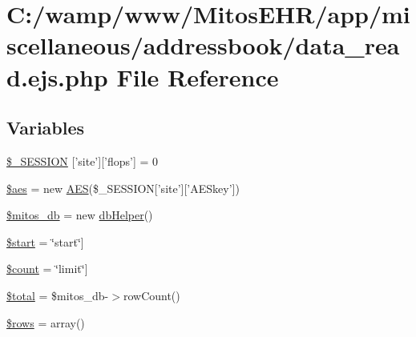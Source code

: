 \hypertarget{miscellaneous_2addressbook_2data__read_8ejs_8php}{\section{\-C\-:/wamp/www/\-Mitos\-E\-H\-R/app/miscellaneous/addressbook/data\-\_\-read.ejs.\-php \-File \-Reference}
\label{miscellaneous_2addressbook_2data__read_8ejs_8php}
}
\subsection*{\-Variables}
\begin{DoxyCompactItemize}
\item 
\hyperlink{miscellaneous_2addressbook_2data__read_8ejs_8php_a99fda8552a3e58235643b79f5af3ded8}{\$\-\_\-\-S\-E\-S\-S\-I\-O\-N} \mbox{[}'site'\mbox{]}\mbox{[}'flops'\mbox{]} = 0
\item 
\hyperlink{miscellaneous_2addressbook_2data__read_8ejs_8php_ab30046a94291cd07e400855e9c786ef3}{\$aes} = new \hyperlink{class_a_e_s}{\-A\-E\-S}(\$\-\_\-\-S\-E\-S\-S\-I\-O\-N\mbox{[}'site'\mbox{]}\mbox{[}'\-A\-E\-Skey'\mbox{]})
\item 
\hyperlink{miscellaneous_2addressbook_2data__read_8ejs_8php_ab5d961f93efe4e2e8d8374f01dd6c65a}{\$mitos\-\_\-db} = new \hyperlink{classdb_helper}{db\-Helper}()
\item 
\hyperlink{miscellaneous_2addressbook_2data__read_8ejs_8php_a50a00e7de77365e00b117e73aa82fb9b}{\$start} = \char`\"{}start\char`\"{}\mbox{]}
\item 
\hyperlink{miscellaneous_2addressbook_2data__read_8ejs_8php_af789423037bbc89dc7c850e761177570}{\$count} = \char`\"{}limit\char`\"{}\mbox{]}
\item 
\hyperlink{miscellaneous_2addressbook_2data__read_8ejs_8php_a241b818f48030b628685b2e5119c5624}{\$total} = \$mitos\-\_\-db-\/$>$row\-Count()
\item 
\hyperlink{miscellaneous_2addressbook_2data__read_8ejs_8php_ace2ec39e7df3899fa8df9640ec274b03}{\$rows} = array()
\end{DoxyCompactItemize}



